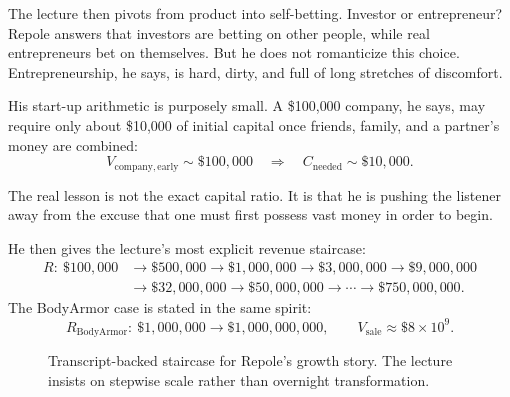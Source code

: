 The lecture then pivots from product into self-betting. Investor or entrepreneur? Repole answers that investors are betting on other people, while real entrepreneurs bet on themselves. But he does not romanticize this choice. Entrepreneurship, he says, is hard, dirty, and full of long stretches of discomfort.

His start-up arithmetic is purposely small. A \$100{,}000 company, he says, may require only about \$10{,}000 of initial capital once friends, family, and a partner's money are combined:
\begin{equation}
V_{\mathrm{company,early}} \sim \$100{,}000
\quad \Rightarrow \quad
C_{\mathrm{needed}} \sim \$10{,}000.
\end{equation}

The real lesson is not the exact capital ratio. It is that he is pushing the listener away from the excuse that one must first possess vast money in order to begin.

He then gives the lecture's most explicit revenue staircase:
\begin{align}
R:\ 
\$100{,}000
&\to \$500{,}000
\to \$1{,}000{,}000
\to \$3{,}000{,}000
\to \$9{,}000{,}000 \nonumber\\
&\to \$32{,}000{,}000
\to \$50{,}000{,}000
\to \cdots
\to \$750{,}000{,}000.
\end{align}
The BodyArmor case is stated in the same spirit:
\begin{equation}
R_{\mathrm{BodyArmor}}:\ \$1{,}000{,}000 \to \$1{,}000{,}000{,}000,
\qquad
V_{\mathrm{sale}} \approx \$8\times 10^9.
\end{equation}

\begin{figure}[h]
\centering
{}
\caption{Transcript-backed staircase for Repole's growth story. The lecture insists on stepwise scale rather than overnight transformation.}
\end{figure}

